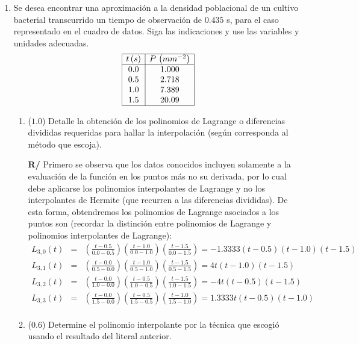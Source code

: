 \documentclass[12pt]{article}
\begin{document}
  \begin{enumerate}[leftmargin=*,widest=9]
  
    \item {\small Se desea encontrar una aproximación a la densidad poblacional de un cultivo bacterial transcurrido un tiempo de observación de \(0.435\) s, para el caso representado en el cuadro de datos. Siga las indicaciones y use las variables y unidades adecuadas.
\vspace*{-.7cm}
\[
\begin{array}{|c|c|}
\hline
t\, (s) & P\, \left(mm^{-2}\right) \\
\hline
0.0 & 1.000 \\
0.5 & 2.718 \\
1.0 & 7.389 \\
1.5 & 20.09 \\
\hline
\end{array}
\]
\vspace{-.9cm}    
    
    }
    
   \begin{enumerate}[label=\alph*]
    \item (\(1.0\)) Detalle la obtención de los polinomios de Lagrange o diferencias divididas requeridas para hallar la interpolación (según corresponda al método que escoja).
    
    \textbf{R/} Primero se observa que los datos conocidos incluyen solamente a la evaluación de la función en los puntos más no su derivada, por lo cual debe aplicarse los polinomios interpolantes de Lagrange y no los interpolantes de Hermite (que recurren a las diferencias divididas).
    De esta forma, obtendremos los polinomios de Lagrange asociados a los puntos son (recordar la distinción entre polinomios de Lagrange y polinomios interpolantes de Lagrange):
    \begin{eqnarray*}
    L_{3,0}(t) & = & \left(\frac{t-0.5}{0.0-0.5} \right) \left(\frac{t-1.0}{0.0-1.0} \right) \left(\frac{t-1.5}{0.0-1.5} \right) =  -1.3333(t-0.5)(t-1.0)(t-1.5) \\
    L_{3,1}(t) & = & \left(\frac{t-0.0}{0.5-0.0} \right) \left(\frac{t-1.0}{0.5-1.0} \right) \left(\frac{t-1.5}{0.5-1.5} \right) = 4t(t-1.0)(t-1.5) \\
    L_{3,2}(t) & = & \left(\frac{t-0.0}{1.0-0.0} \right) \left(\frac{t-0.5}{1.0-0.5} \right) \left(\frac{t-1.5}{1.0-1.5} \right) = -4t(t-0.5)(t-1.5) \\
    L_{3,3}(t) & = & \left(\frac{t-0.0}{1.5-0.0} \right) \left(\frac{t-0.5}{1.5-0.5} \right) \left(\frac{t-1.0}{1.5-1.0} \right) = 1.3333t(t-0.5)(t-1.0) \\
    \end{eqnarray*}
    \item (\(0.6\)) Determine el polinomio interpolante por la técnica que escogió usando el resultado del literal anterior.
    

\end{enumerate}
\end{enumerate}
\end{document}
